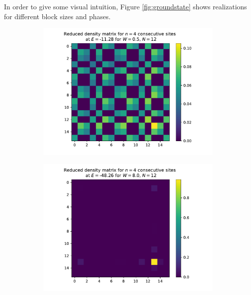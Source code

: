 \documentclass[reprint,amsmath,amssymb,aps,prb]{revtex4-2}
\begin{document}
In order to give some visual intuition, Figure \ref{fig:groundstate} shows realizations for different block sizes and phases.
\onecolumngrid
\begin{center}
\begin{figure}[H]
	\centering	
	\begin{subfigure}[c]{0.45\textwidth}
		\includegraphics[width=\textwidth]{../results/groundstates/N12n4_trainingset_groundstate_Wmax0.5.pdf}
	\end{subfigure}
	\begin{subfigure}[c]{0.45\textwidth}
		\includegraphics[width=\textwidth]{../results/groundstates/N12n4_trainingset_groundstate_Wmax8.0.pdf}

\end{subfigure}
\end{figure}
\end{center}
\end{document}
